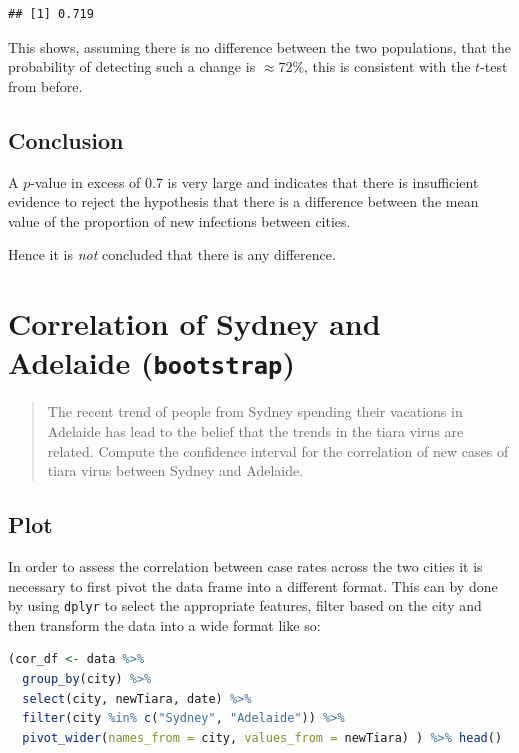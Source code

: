 \documentclass{article}
\newcommand{\passthrough}[1]{#1}
\begin{document}
\begin{lstlisting}
## [1] 0.719
\end{lstlisting}

This shows, assuming there is no difference between the two populations,
that the probability of detecting such a change is \(\approx 72\%\),
this is consistent with the \(t\)-test from before.

\hypertarget{conclusion-1}{%
\subsection{Conclusion}\label{conclusion-1}}

A \(p\)-value in excess of 0.7 is very large and indicates that there is
insufficient evidence to reject the hypothesis that there is a
difference between the mean value of the proportion of new infections
between cities.

Hence it is \emph{not} concluded that there is any difference.

\hypertarget{question-3}{%
\section{Correlation of Sydney and Adelaide \normalsize \qquad (\texttt{bootstrap})}\label{question-3}}

\begin{quote}
The recent trend of people from Sydney spending their vacations in
Adelaide has lead to the belief that the trends in the tiara virus are
related. Compute the confidence interval for the correlation of new
cases of tiara virus between Sydney and Adelaide.
\end{quote}

\hypertarget{plot-2}{%
\subsection{Plot}\label{plot-2}}

In order to assess the correlation between case rates across the two
cities it is necessary to first pivot the data frame into a different
format. This can by done by using \passthrough{\lstinline!dplyr!} to
select the appropriate features, filter based on the city and then
transform the data into a wide format like so:

\begin{lstlisting}[language=R]
(cor_df <- data %>%
  group_by(city) %>%
  select(city, newTiara, date) %>%
  filter(city %in% c("Sydney", "Adelaide")) %>%
  pivot_wider(names_from = city, values_from = newTiara) ) %>% head()
\end{lstlisting}
\end{document}

